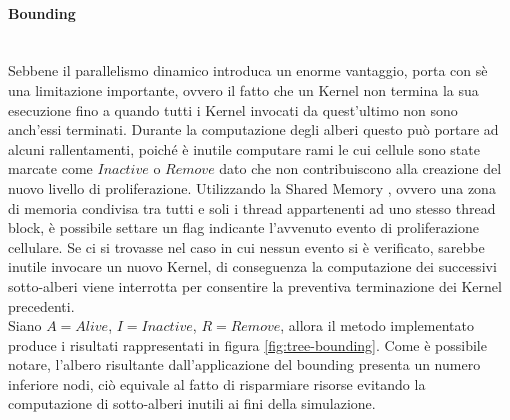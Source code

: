 \paragraph{Bounding}\mbox{}
\\
Sebbene il parallelismo dinamico introduca un enorme vantaggio, porta con sè
una limitazione importante, ovvero il fatto che un Kernel non termina la sua
esecuzione fino a quando tutti i Kernel invocati da quest'ultimo non sono
anch'essi terminati. Durante la computazione degli alberi questo può portare
ad alcuni rallentamenti, poiché è inutile computare rami le cui cellule
sono state marcate come $Inactive$ o $Remove$ dato che non contribuiscono
alla creazione del nuovo livello di proliferazione.
Utilizzando la Shared Memory\cite{sanders2010cuda}
, ovvero una zona di memoria condivisa tra tutti e soli i thread appartenenti ad
uno stesso thread block, è possibile
settare un flag indicante l'avvenuto evento di proliferazione
cellulare. Se ci si trovasse nel caso in cui nessun evento si è verificato,
sarebbe inutile invocare un nuovo Kernel, di conseguenza
la computazione dei successivi sotto-alberi viene interrotta per consentire
la preventiva terminazione dei Kernel precedenti.
\\
Siano $A = Alive$, $I = Inactive$, $R = Remove$, allora il metodo implementato
produce i risultati rappresentati in figura \ref{fig:tree-bounding}.
Come è possibile notare,
l'albero risultante dall'applicazione del
bounding presenta un numero inferiore nodi, ciò equivale al fatto di risparmiare
risorse evitando la computazione di sotto-alberi inutili ai fini della
simulazione.

